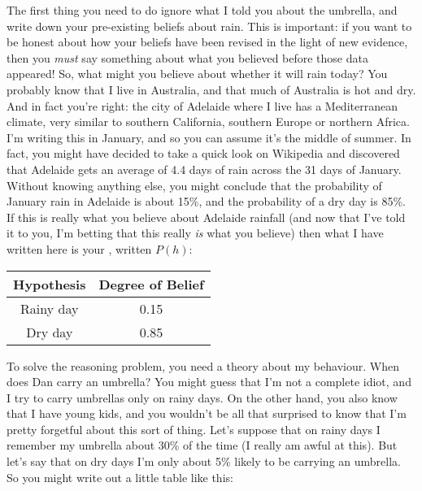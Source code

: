
The first thing you need to do ignore what I told you about the umbrella, and write down your pre-existing beliefs about rain. This is important: if you want to be honest about how your beliefs have been revised in the light of new evidence, then you {\it must} say something about what you believed before those data appeared! So, what might you believe about whether it will rain today? You probably know that I live in Australia, and that much of Australia is hot and dry. And in fact you're right: the city of Adelaide where I live has a Mediterranean climate, very similar to southern California, southern Europe or northern Africa. I'm writing this in January, and so you can assume it's the middle of summer. In fact, you might have decided to take a quick look on Wikipedia and discovered that Adelaide gets an average of 4.4 days of rain across the 31 days of January. Without knowing anything else, you might conclude that the probability of January rain in Adelaide is about 15\%, and the probability of a dry day is 85\%. If this is really what you believe about Adelaide rainfall (and now that I've told it to you, I'm betting that this really {\it is} what you believe) then what I have written here is your , written $P(h)$:

\begin{center}
\begin{tabular}{c|c}
Hypothesis & Degree of Belief \\ \hline
Rainy day & 0.15 \\
Dry day & 0.85
\end{tabular}
\end{center}



To solve the reasoning problem, you need a theory about my behaviour. When does Dan carry an umbrella? You might guess that I'm not a complete idiot, and I try to carry umbrellas only on rainy days. On the other hand, you also know that I have young kids, and you wouldn't be all that surprised to know that I'm pretty forgetful about this sort of thing. Let's suppose that on rainy days I remember my umbrella about 30\% of the time (I really am awful at this). But let's say that on dry days I'm only about 5\% likely to be carrying an umbrella. So you might write out a little table like this:

